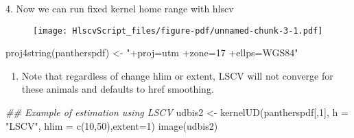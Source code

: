 \documentclass[
  letterpaper,
]{book}
\newenvironment{Shaded}{\begin{snugshade}}{\end{snugshade}}
\newcommand{\AttributeTok}[1]{\textcolor[rgb]{0.40,0.45,0.13}{#1}}
\newcommand{\DecValTok}[1]{\textcolor[rgb]{0.68,0.00,0.00}{#1}}
\newcommand{\DocumentationTok}[1]{\textcolor[rgb]{0.37,0.37,0.37}{\textit{#1}}}
\newcommand{\FunctionTok}[1]{\textcolor[rgb]{0.28,0.35,0.67}{#1}}
\newcommand{\NormalTok}[1]{\textcolor[rgb]{0.00,0.23,0.31}{#1}}
\newcommand{\OtherTok}[1]{\textcolor[rgb]{0.00,0.23,0.31}{#1}}
\newcommand{\SpecialCharTok}[1]{\textcolor[rgb]{0.37,0.37,0.37}{#1}}
\newcommand{\StringTok}[1]{\textcolor[rgb]{0.13,0.47,0.30}{#1}}
\providecommand{\tightlist}{%
  \setlength{\itemsep}{0pt}\setlength{\parskip}{0pt}}\usepackage{longtable,booktabs,array}
\begin{document}
4. Now we can run fixed kernel home range with hlscv

\begin{Shaded}
\end{Shaded}

\begin{figure}[H]

{\centering \texttt{[image: HlscvScript\_files/figure-pdf/unnamed-chunk-3-1.pdf]}

}

\end{figure}

\begin{Shaded}
\begin{Highlighting}[]
\FunctionTok{proj4string}\NormalTok{(pantherspdf) }\OtherTok{\textless{}{-}} \StringTok{"+proj=utm +zone=17 +ellps=WGS84"}
\end{Highlighting}
\end{Shaded}

\begin{enumerate}
\def\labelenumi{\arabic{enumi}.}
\setcounter{enumi}{4}
\tightlist
\item
  Note that regardless of change hlim or extent, LSCV will not converge
  for these animals and defaults to href smoothing.
\end{enumerate}

\begin{Shaded}
\begin{Highlighting}[]
\DocumentationTok{\#\# Example of estimation using LSCV}
\NormalTok{udbis2 }\OtherTok{\textless{}{-}} \FunctionTok{kernelUD}\NormalTok{(pantherspdf[,}\DecValTok{1}\NormalTok{], }\AttributeTok{h =} \StringTok{"LSCV"}\NormalTok{, }\AttributeTok{hlim =} \FunctionTok{c}\NormalTok{(}\DecValTok{10}\NormalTok{,}\DecValTok{50}\NormalTok{),}\AttributeTok{extent=}\DecValTok{1}\NormalTok{)}
\FunctionTok{image}\NormalTok{(udbis2)}
\end{Highlighting}
\end{Shaded}
\end{document}
